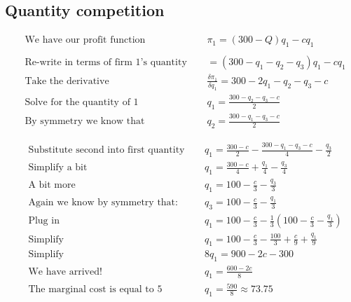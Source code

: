 \documentclass[12pt]{report}
\numberwithin{equation}{section}
\begin{document}
\subsection{Quantity competition}
\begin{align*}
&\text{We have our profit function} ~~ 
&& \pi_1=(300-Q)q_1 - cq_1 \\
\\
&\text{Re-write in terms of firm 1's quantity} ~~ 
&&  =  (300-q_1-q_2-q_3)q_1 - cq_1
\\
&\text{Take the derivative} ~~ 
&&  \frac{\delta \pi_1}{\delta q_1} =  300-2q_1-q_2-q_3 - c
\\
&\text{Solve for the quantity of 1} ~~ 
&&  q_1= \frac{300-q_2-q_3-c}{2}
\\
&\text{By symmetry we know that} ~~ 
&&  q_2= \frac{300-q_1-q_3-c}{2}
\end{align*}

\begin{align*}
&\text{Substitute second into first quantity} ~~ 
&&  q_1= \frac{300-c}{2} -\frac{300-q_1-q_3-c}{4} - \frac{q_3}{2}
\\
&\text{Simplify a bit} ~~ 
&& q_1= \frac{300-c}{4} + \frac{q_1}{4} - \frac{q_3}{4}
\\
&\text{A bit more} ~~ 
&& q_1= 100 - \frac{c}{3} - \frac{q_3}{3}
\\
&\text{Again we know by symmetry that:} ~~ 
&& q_3= 100 - \frac{c}{3} - \frac{q_1}{3} 
\\
&\text{Plug in} ~~ 
&& q_1= 100 - \frac{c}{3} - \frac{1}{3} \left( 100 - \frac{c}{3} - \frac{q_1}{3} \right)
\\
&\text{Simplify} ~~ 
&& q_1= 100 - \frac{c}{3} - \frac{100}{3} + \frac{c}{9} + \frac{q_1}{9}
\\
&\text{Simplify} ~~ 
&& 8q_1= 900 - 2c - 300
\\
&\text{We have arrived!} ~~ 
&& q_1= \frac{600 - 2c}{8}
\\
&\text{The marginal cost is equal to 5} ~~ 
&& q_1= \frac{590}{8} \approx 73.75  
\end{align*}
\end{document}
